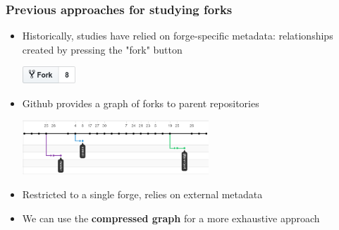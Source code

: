 \documentclass[aspectratio=169,xcolor=table]{beamer}
\begin{document}
    \begin{frame}
        \frametitle{Previous approaches for studying forks}

        \begin{block}{}
            \begin{itemize}
                \item Historically, studies have relied on forge-specific
                    metadata: relationships created by pressing the "fork"
                    button
                    \begin{center}
                        \includegraphics[width=2cm]{img/forkbutton}
                    \end{center}
                \item Github provides a graph of forks to parent repositories
                    \begin{center}
                        \includegraphics[width=7cm]{img/forknetwork}
                    \end{center}
            \end{itemize}
        \end{block}

        \begin{block}{}
            \begin{itemize}
                \item Restricted to a single forge, relies on external metadata
                \item We can use the \textbf{compressed graph} for a more
                    exhaustive approach
            \end{itemize}
        \end{block}
    \end{frame}
\end{document}
